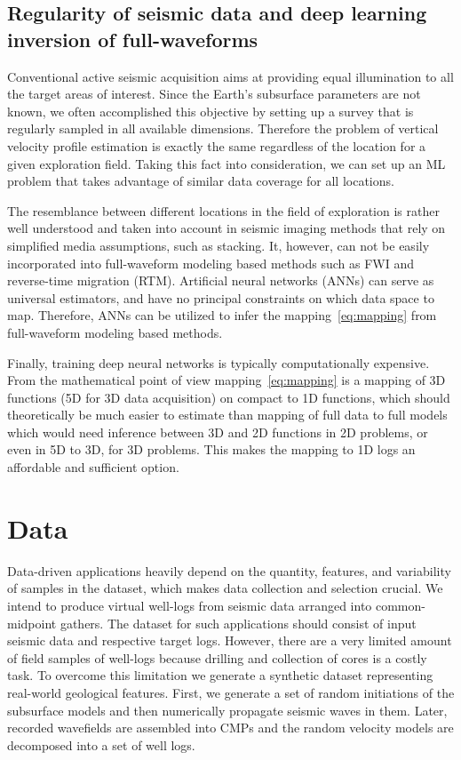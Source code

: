 \documentclass[paper,twocolomn]{geophysics}
\begin{document}
\subsection{Regularity of seismic data and deep learning inversion of full-waveforms}

Conventional active seismic acquisition aims at providing equal illumination to all the target areas of interest. Since the Earth's subsurface parameters are not known, we often accomplished this objective by setting up a survey that is regularly sampled in all available dimensions. Therefore the problem of vertical velocity profile estimation is exactly the same regardless of the location for a given exploration field. Taking this fact into consideration, we can set up an ML problem that takes advantage of similar data coverage for all locations. 

The resemblance between different locations in the field of exploration is rather well understood and taken into account in seismic imaging methods that rely on simplified media assumptions, such as stacking. It, however, can not be easily incorporated into full-waveform modeling based methods such as FWI and reverse-time migration (RTM).   
%
Artificial neural networks (ANNs) can serve as universal estimators, and have no principal constraints on which data space to map. Therefore, ANNs can be utilized to infer the mapping~\eqref{eq:mapping} from full-waveform modeling based methods. 

Finally, training deep neural networks is typically computationally expensive. From the mathematical point of view mapping~\eqref{eq:mapping} is a mapping of 3D functions (5D for 3D data acquisition) on compact to 1D functions, which should theoretically be much easier to estimate than mapping of full data to full models which would need inference between 3D and 2D functions in 2D problems, or even in 5D to 3D, for 3D problems. This makes the mapping to 1D logs an affordable and sufficient option.


\section{Data}
Data-driven applications heavily depend on the quantity, features, and variability of samples in the dataset, which makes data collection and selection crucial. 
%
We intend to produce virtual well-logs from seismic data arranged into common-midpoint gathers. The dataset for such applications should consist of input seismic data and respective target logs. However, there are a very limited amount of field samples of well-logs because drilling and collection of cores is a costly task. 
%
To overcome this limitation we generate a synthetic dataset representing real-world geological features. First, we generate a set of random initiations of the subsurface models and then numerically propagate seismic waves in them. Later, recorded wavefields are assembled into CMPs and the random velocity models are decomposed into a set of well logs.
\end{document}
